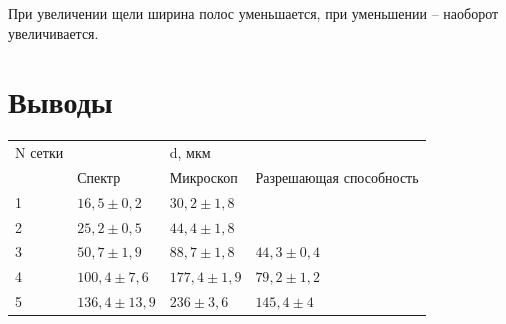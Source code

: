 \documentclass[a4paper, 12pt]{article}
\begin{document}
При увеличении щели ширина полос уменьшается, при уменьшении -- наоборот увеличивается.

\section*{Выводы}

\begin{table}[h!]
\begin{tabular}{|l|lll|}
\hline
N сетки &  &                                 d, мкм                            &                         \\ \cline{2-4} 
        & \multicolumn{1}{l|}{Спектр}       & \multicolumn{1}{l|}{Микроскоп}   & Разрешающая способность \\ \hline
1       & \multicolumn{1}{l|}{$16,5 \pm 0,2$}   & \multicolumn{1}{l|}{$30,2 \pm 1,8$}  &                        \\ \hline
2       & \multicolumn{1}{l|}{$25,2 \pm 0,5$}   & \multicolumn{1}{l|}{$44,4 \pm 1,8$}  &                        \\ \hline
3       & \multicolumn{1}{l|}{$50,7 \pm 1,9$}   & \multicolumn{1}{l|}{$88,7 \pm 1,8$}  & $44,3 \pm 0,4$              \\ \hline
4       & \multicolumn{1}{l|}{$100,4 \pm 7,6$}  & \multicolumn{1}{l|}{$177,4 \pm 1,9$} & $79,2 \pm 1,2$             \\ \hline
5       & \multicolumn{1}{l|}{$136,4 \pm 13,9$} & \multicolumn{1}{l|}{$236 \pm 3,6$}   & $145,4 \pm 4$              \\ \hline
\end{tabular}
\end{table}
\end{document}
